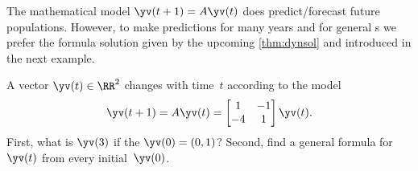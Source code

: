 The mathematical model \(\yv(t+1)=A\yv(t)\) does predict\slash forecast future populations.
However, to make predictions for many years and for general s we prefer the formula solution given by the upcoming \cref{thm:dynsol} and introduced in the next example.





\begin{example} \label{eg:2x2map}
A vector \(\yv(t)\in\RR^2\) changes with time~\(t\) according to the model
\begin{equation*}
\yv(t+1)=A\yv(t)=\begin{bmatrix} 1&-1\\-4&1 \end{bmatrix}\yv(t).
\end{equation*}
First, what is \(\yv(3)\) if the  \(\yv(0)=(0,1)\)?
Second, find a general formula for~\(\yv(t)\) from every initial~\(\yv(0)\).


\end{example}
